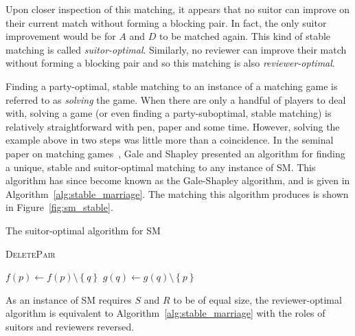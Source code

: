 Upon closer inspection of this matching, it appears that no suitor can improve
on their current match without forming a blocking pair. In fact, the only suitor
improvement would be for \(A\) and \(D\) to be matched again. This kind of
stable matching is called \emph{suitor-optimal}. Similarly, no reviewer can
improve their match without forming a blocking pair and so this matching is also
\emph{reviewer-optimal}.

Finding a party-optimal, stable matching to an instance of a matching game is
referred to as \emph{solving} the game. When there are only a handful of players
to deal with, solving a game (or even finding a party-suboptimal, stable
matching) is relatively straightforward with pen, paper and some time. However,
solving the example above in two steps was little more than a coincidence. 
In the seminal paper on matching games~\cite{Gale1962}, Gale and Shapley
presented an algorithm for finding a unique, stable and suitor-optimal matching
to any instance of SM. This algorithm has since become known as the Gale-Shapley
algorithm, and is given in Algorithm~\ref{alg:stable_marriage}. The matching
this algorithm produces is shown in Figure~\ref{fig:sm_stable}.

\balg%
\caption{The suitor-optimal algorithm for SM}\label{alg:stable_marriage}

\vspace{1em}

\ealg%

\balg%
\caption{\textsc{DeletePair}}\label{alg:delete}
\vspace{1em}

\(f(p) \gets f(p) \setminus \left\{q\right\}\)\;
\(g(q) \gets g(q) \setminus \left\{p\right\}\)\;
\ealg%

As an instance of SM requires \(S\) and \(R\) to be of equal size, the
reviewer-optimal algorithm is equivalent to Algorithm~\ref{alg:stable_marriage}
with the roles of suitors and reviewers reversed.

